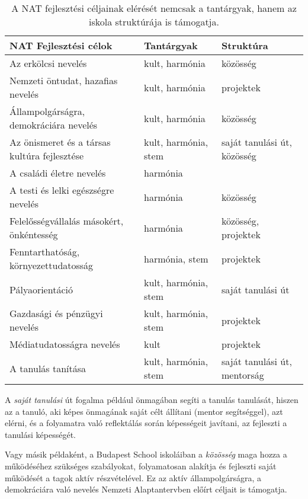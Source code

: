 \begin{table}

  \begin{tabular}{p{5cm}|>{\raggedright}p{3cm}|p{3cm}}


    \textbf{NAT Fejlesztési célok} & \textbf{Tantárgyak} & \textbf{Struktúra}\\ \hline
Az erkölcsi nevelés & kult, harmónia & közösség\\ \hline
Nemzeti öntudat, hazafias nevelés & kult, harmónia & projektek\\ \hline
Állampolgárságra, demokráciára nevelés & kult, harmónia & közösség\\ \hline
Az önismeret és a társas kultúra fejlesztése & kult, harmónia, stem & saját tanulási út, közösség\\ \hline
A családi életre nevelés & harmónia &  \\ \hline
A testi és lelki egészségre nevelés & harmónia & közösség\\ \hline
Felelősségvállalás másokért, önkéntesség & harmónia & közösség, pro\-jek\-tek\\ \hline
Fenntarthatóság, környezettudatosság & harmónia, stem & projektek\\ \hline
Pályaorientáció & kult, harmónia, stem & saját tanulási út\\ \hline
Gazdasági és pénzügyi nevelés & kult, harmónia, stem & projektek\\ \hline
Médiatudatosságra nevelés & kult & projektek\\ \hline
A tanulás tanítása & kult, harmónia, stem & saját tanulási út, mentorság\\

  \end{tabular}
  \caption{A NAT fejlesztési céljainak elérését nemcsak a tantárgyak, hanem az iskola struktúrája is támogatja.}
  \label{tbl:nat_fejlesztesi}
\end{table}


A \emph{saját tanulási} út fogalma például önmagában segíti a tanulás tanulását, hiszen az a tanuló, aki képes önmagának saját célt állítani (mentor segítséggel), azt elérni, és a folyamatra való reflektálás során képességeit javítani, az fejleszti a tanulási képességét.

Vagy másik példaként, a Budapest School iskoláiban a \emph{közösség} maga hozza a működéséhez szükséges szabályokat, folyamatosan alakítja és fejleszti saját működését a tagok aktív részvételével. Ez az aktív állampolgárságra, a demokráciára való nevelés Nemzeti Alaptantervben előírt céljait is támogatja.

